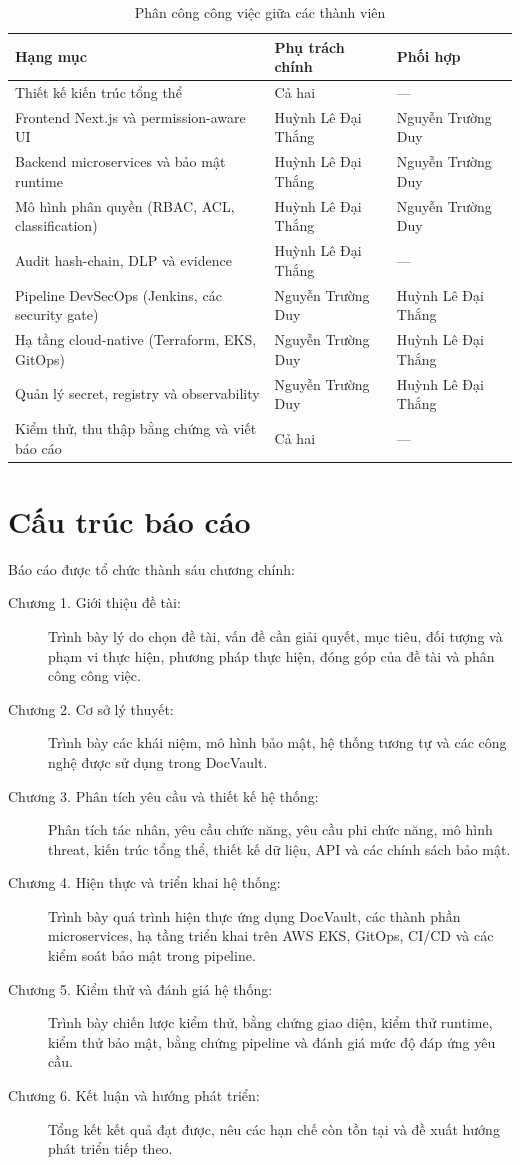 \begin{table}[H]
\centering
\small
\caption{Phân công công việc giữa các thành viên}
\label{tab:work-assignment}
\begin{tabularx}{\textwidth}{p{}p{}Y}
\toprule
\textbf{Hạng mục} & \textbf{Phụ trách chính} & \textbf{Phối hợp} \\
\midrule
Thiết kế kiến trúc tổng thể & Cả hai & --- \\
Frontend Next.js và permission-aware UI & Huỳnh Lê Đại Thắng & Nguyễn Trường Duy \\
Backend microservices và bảo mật runtime & Huỳnh Lê Đại Thắng & Nguyễn Trường Duy \\
Mô hình phân quyền (RBAC, ACL, classification) & Huỳnh Lê Đại Thắng & Nguyễn Trường Duy \\
Audit hash-chain, DLP và evidence & Huỳnh Lê Đại Thắng & --- \\
Pipeline DevSecOps (Jenkins, các security gate) & Nguyễn Trường Duy & Huỳnh Lê Đại Thắng \\
Hạ tầng cloud-native (Terraform, EKS, GitOps) & Nguyễn Trường Duy & Huỳnh Lê Đại Thắng \\
Quản lý secret, registry và observability & Nguyễn Trường Duy & Huỳnh Lê Đại Thắng \\
Kiểm thử, thu thập bằng chứng và viết báo cáo & Cả hai & --- \\
\bottomrule
\end{tabularx}
\end{table}

\section{Cấu trúc báo cáo}

Báo cáo được tổ chức thành sáu chương chính:

\begin{description}
  \item[Chương 1. Giới thiệu đề tài:] Trình bày lý do chọn đề tài, vấn đề cần giải quyết, mục tiêu, đối tượng và phạm vi thực hiện, phương pháp thực hiện, đóng góp của đề tài và phân công công việc.
  \item[Chương 2. Cơ sở lý thuyết:] Trình bày các khái niệm, mô hình bảo mật, hệ thống tương tự và các công nghệ được sử dụng trong DocVault.
  \item[Chương 3. Phân tích yêu cầu và thiết kế hệ thống:] Phân tích tác nhân, yêu cầu chức năng, yêu cầu phi chức năng, mô hình threat, kiến trúc tổng thể, thiết kế dữ liệu, API và các chính sách bảo mật.
  \item[Chương 4. Hiện thực và triển khai hệ thống:] Trình bày quá trình hiện thực ứng dụng DocVault, các thành phần microservices, hạ tầng triển khai trên AWS EKS, GitOps, CI/CD và các kiểm soát bảo mật trong pipeline.
  \item[Chương 5. Kiểm thử và đánh giá hệ thống:] Trình bày chiến lược kiểm thử, bằng chứng giao diện, kiểm thử runtime, kiểm thử bảo mật, bằng chứng pipeline và đánh giá mức độ đáp ứng yêu cầu.
  \item[Chương 6. Kết luận và hướng phát triển:] Tổng kết kết quả đạt được, nêu các hạn chế còn tồn tại và đề xuất hướng phát triển tiếp theo.
\end{description}
